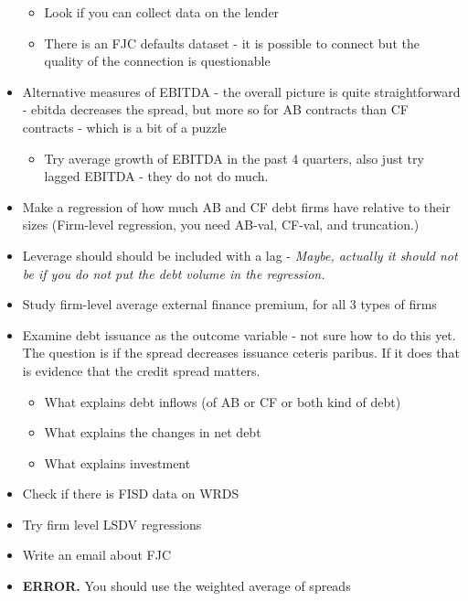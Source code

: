 \documentclass[12pt]{article}
\begin{document}
\begin{itemize}
\begin{itemize}
        \item Look if you can collect data on the lender 
        \item There is an FJC defaults dataset - it is possible to connect but the quality of the connection is questionable \checkmark
    \end{itemize}
    \item Alternative measures of EBITDA \checkmark - the overall picture is quite straightforward - ebitda decreases the spread, but more so for AB contracts than CF contracts - which is a bit of a puzzle 
    \begin{itemize}
        \item Try average growth of EBITDA in the past 4 quarters, also just try lagged EBITDA - they do not do much. \checkmark
    \end{itemize}
    \item Make a regression of how much AB and CF debt firms have relative to their sizes (Firm-level regression, you need AB-val, CF-val, and truncation.) \checkmark
    \item Leverage should should be included with a lag - \textit{Maybe, actually it should not be if you do not put the debt volume in the regression.} \checkmark
    \item Study firm-level average external finance premium, for all 3 types of firms \checkmark
    \item Examine debt issuance as the outcome variable - not sure how to do this yet. The question is if the spread decreases issuance ceteris paribus. If it does that is evidence that the credit spread matters. \checkmark
    \begin{itemize}
        \item What explains debt inflows (of AB or CF or both kind of debt) \checkmark
        \item What explains the changes in net debt \checkmark
        \item What explains investment \checkmark
    \end{itemize}
    \item Check if there is FISD data on WRDS
    \item Try firm level LSDV regressions \checkmark
    \item Write an email about FJC 
    \item \textbf{ERROR.} You should use the weighted average of spreads
\end{itemize} \normalsize

\newpage
\end{document}
